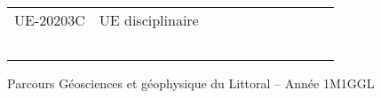 \documentclass[a4paper,11pt]{article}
\begin{document}
{{\begin{tabular}{lllllllllll}
\rowcolor[HTML]{C0C0C0} 
UE-20203C                      & UE disciplinaire                                   &                           &                           &                           &                                    &                             &                             &                                    &                                  &                                  \\
                               &                                                    &                           &                           &                           &                                    &                             &                             &                                    &                                  &                                  \\
                               &                                                    &                           &                           &                           &                                    &                             &                             &                                    &                                  &                                  \\
                               &                                                    &                           &                           &                           &                                    &                             &                             &                                    &                                  &                                  \\
                               &                                                    &                           &                           &                           &                                    &                             &                             &                                    &                                  &                                  \\
                               &                                                    &                           &                           &                           &                                    &                             &                             &                                    &                                  &                                 
\end{tabular}
}
}{Parcours Géosciences et géophysique du Littoral -- Année 1}{M1GGL}
\end{document}

